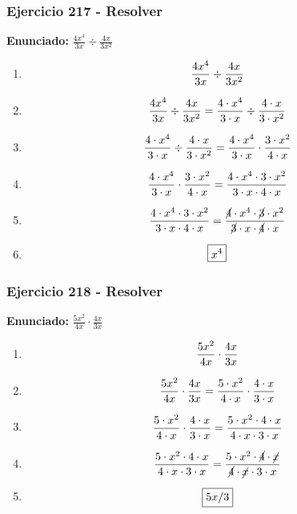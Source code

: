 \documentclass[11pt,a4paper]{article}
\newcommand{\fitmath}[1]{%
\[
\setbox0=\hbox{$\displaystyle #1$}%
\ifdim\wd0>\linewidth
\resizebox{\linewidth}{!}{$\displaystyle #1$}%
\else
#1%
\fi
\]
}
\begin{document}
\vspace{0.12cm}
\subsubsection*{Ejercicio 217 - Resolver}
\textbf{Enunciado:} $ \frac{4 x^{4}}{3 x} \div \frac{4 x}{3 x^{2}} $\par
\begin{enumerate}[leftmargin=2em]
\item \fitmath{\frac{4 x^{4}}{3 x} \div \frac{4 x}{3 x^{2}}}
\item \fitmath{\frac{4 x^{4}}{3 x} \div \frac{4 x}{3 x^{2}}= \frac{4\cdot x^{4}}{3\cdot x} \div \frac{4\cdot x}{3\cdot x^{2}}}
\item \fitmath{\frac{4\cdot x^{4}}{3\cdot x}\div \frac{4\cdot x}{3\cdot x^{2}}= \frac{4\cdot x^{4}}{3\cdot x}\cdot \frac{3\cdot x^{2}}{4\cdot x}}
\item \fitmath{\frac{4\cdot x^{4}}{3\cdot x}\cdot \frac{3\cdot x^{2}}{4\cdot x}= \frac{4\cdot x^{4}\cdot 3\cdot x^{2}}{3\cdot x\cdot 4\cdot x}}
\item \fitmath{\frac{4\cdot x^{4}\cdot 3\cdot x^{2}}{3\cdot x\cdot 4\cdot x}= \frac{\cancel{4}\cdot x^{4}\cdot \cancel{3}\cdot x^{2}}{\cancel{3}\cdot x\cdot \cancel{4}\cdot x}}
\item \fitmath{\boxed{x^{4}}}
\end{enumerate}

\vspace{0.12cm}
\subsubsection*{Ejercicio 218 - Resolver}
\textbf{Enunciado:} $ \frac{5 x^{2}}{4 x} \cdot \frac{4 x}{3 x} $\par
\begin{enumerate}[leftmargin=2em]
\item \fitmath{\frac{5 x^{2}}{4 x} \cdot \frac{4 x}{3 x}}
\item \fitmath{\frac{5 x^{2}}{4 x} \cdot \frac{4 x}{3 x}= \frac{5\cdot x^{2}}{4\cdot x} \cdot \frac{4\cdot x}{3\cdot x}}
\item \fitmath{\frac{5\cdot x^{2}}{4\cdot x}\cdot \frac{4\cdot x}{3\cdot x}= \frac{5\cdot x^{2}\cdot 4\cdot x}{4\cdot x\cdot 3\cdot x}}
\item \fitmath{\frac{5\cdot x^{2}\cdot 4\cdot x}{4\cdot x\cdot 3\cdot x}= \frac{5\cdot x^{2}\cdot \cancel{4}\cdot \cancel{x}}{\cancel{4}\cdot \cancel{x}\cdot 3\cdot x}}
\item \fitmath{\boxed{5 x / 3}}
\end{enumerate}
\end{document}
